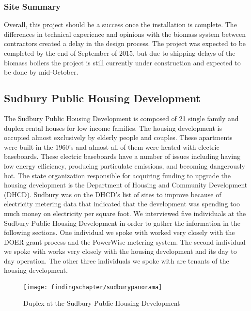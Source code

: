 \subsubsection{Site Summary}
\par Overall, this project should be a success once the installation is complete. The differences in technical experience and opinions with the biomass system between contractors created a delay in the design process. The project was expected to be completed by the end of September of 2015, but due to shipping delays of the biomass boilers the project is still currently under construction and expected to be done by mid-October.

\subsection{Sudbury Public Housing Development}
\par The Sudbury Public Housing Development is composed of 21 single family and duplex rental houses for low income families. The housing development is occupied almost exclusively by elderly people and couples. These apartments were built in the 1960’s and almost all of them were heated with electric baseboards. These electric baseboards have a number of issues including having low energy efficiency, producing particulate emissions, and becoming dangerously hot. The state organization responsible for acquiring funding to upgrade the housing development is the Department of Housing and Community Development (DHCD). Sudbury was on the DHCD’s list of sites to improve because of electricity metering data that indicated that the development was spending too much money on electricity per square foot. We interviewed five individuals at the Sudbury Public Housing Development in order to gather the information in the following sections. One individual we spoke with worked very closely with the DOER grant process and the PowerWise metering system. The second individual we spoke with works very closely with the housing development and its day to day operation. The other three individuals we spoke with are tenants of the housing development.
\begin{figure}[H]
\centering
\texttt{[image: findingschapter/sudburypanorama]}
\caption{Duplex at the Sudbury Public Housing Development}
\end{figure}

